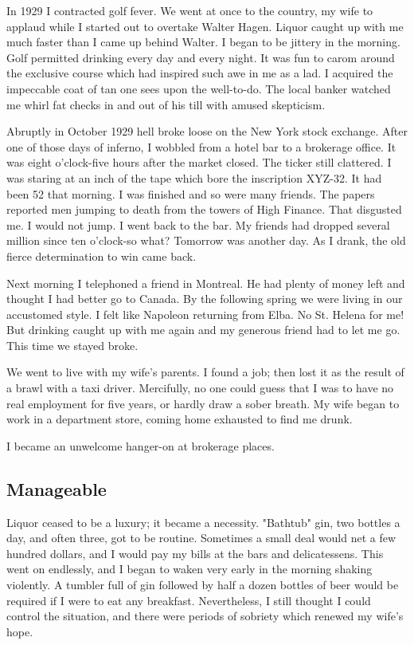 In 1929 I contracted golf fever.
We went at once to the country, my wife to applaud while I started out to overtake Walter Hagen.
Liquor caught up with me much faster than I came up behind Walter.
I began to be jittery in the morning.
Golf permitted drinking every day and every night.
It was fun to carom around the exclusive course which had inspired such awe in me as a lad.
I acquired the impeccable coat of tan one sees upon the well-to-do.
The local banker watched me whirl fat checks in and out of his till with amused skepticism.

Abruptly in October 1929 hell broke loose on the New York stock exchange.
After one of those days of inferno, I wobbled from a hotel bar to a brokerage office.
It was eight o'clock-five hours after the market closed.
The ticker still clattered.
I was staring at an inch of the tape which bore the inscription XYZ-32.
It had been 52 that morning.
I was finished and so were many friends.
The papers reported men jumping to death from the towers of High Finance.
That disgusted me.
I would not jump.
I went back to the bar.
My friends had dropped several million since ten o'clock-so what?
Tomorrow was another day.
As I drank, the old fierce determination to win came back.

Next morning I telephoned a friend in Montreal.
He had plenty of money left and thought I had better go to Canada.
By the following spring we were living in our accustomed style.
I felt like Napoleon returning from Elba.
No St. Helena for me!
But drinking caught up with me again and my generous friend had to let me go.
This time we stayed broke.

We went to live with my wife's parents.
I found a job; then lost it as the result of a brawl with a taxi driver.
Mercifully, no one could guess that I was to have no real employment for five years, or hardly draw a sober breath.
My wife began to work in a department store, coming home exhausted to find me drunk.

I became an unwelcome hanger-on at brokerage places.


\subsection{Manageable}

Liquor ceased to be a luxury; it became a necessity.
"Bathtub" gin, two bottles a day, and often three, got to be routine.
Sometimes a small deal would net a few hundred dollars, and I would pay my bills at the bars and delicatessens.
This went on endlessly, and I began to waken very early in the morning shaking violently.
A tumbler full of gin followed by half a dozen bottles of beer would be required if I were to eat any breakfast.
Nevertheless, I still thought I could control the situation, and there were periods of sobriety which renewed my wife's hope.

